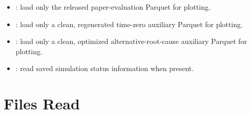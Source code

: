 \documentclass[11pt]{article}
\begin{document}
\begin{itemize}
\item {}: load only the released paper-evaluation Parquet for plotting.
\item {}: load only a clean, regenerated time-zero auxiliary Parquet for plotting.
\item {}: load only a clean, optimized alternative-root-cause auxiliary Parquet for plotting.
\item {}: read saved simulation status information when present.
\end{itemize}

\section*{Files Read}
\end{document}
